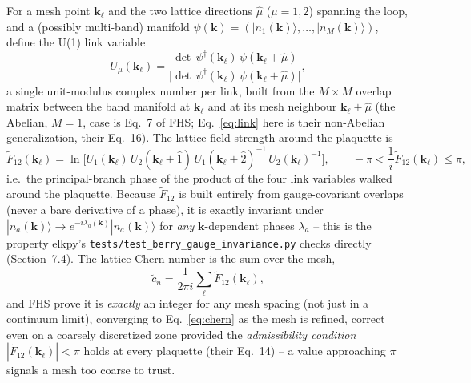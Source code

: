 \documentclass[11pt]{article}
\begin{document}
For a mesh point $\mathbf k_\ell$ and the two lattice directions $\hat\mu$ ($\mu=1,2$)
spanning the loop, and a (possibly multi-band) manifold $\psi(\mathbf k) =
(|n_1(\mathbf k)\rangle,\dots,|n_M(\mathbf k)\rangle)$, define the U(1) link variable
\begin{equation}
  U_\mu(\mathbf k_\ell) = \frac{\det\, \psi^\dagger(\mathbf k_\ell)\,
    \psi(\mathbf k_\ell+\hat\mu)}{\bigl|\det\, \psi^\dagger(\mathbf k_\ell)\,
    \psi(\mathbf k_\ell+\hat\mu)\bigr|},
  \label{eq:link}
\end{equation}
a single unit-modulus complex number per link, built from the $M \times M$ overlap
matrix between the band manifold at $\mathbf k_\ell$ and at its mesh neighbour
$\mathbf k_\ell+\hat\mu$ (the Abelian, $M=1$, case is Eq.~7 of FHS; Eq.~\eqref{eq:link}
here is their non-Abelian generalization, their Eq.~16). The lattice field strength
around the plaquette is
\begin{equation}
  \tilde F_{12}(\mathbf k_\ell) = \ln\!\bigl[
    U_1(\mathbf k_\ell)\, U_2(\mathbf k_\ell+\hat 1)\,
    U_1(\mathbf k_\ell+\hat 2)^{-1}\, U_2(\mathbf k_\ell)^{-1} \bigr],
  \qquad -\pi < \frac{1}{i}\tilde F_{12}(\mathbf k_\ell) \le \pi,
  \label{eq:fieldstrength}
\end{equation}
i.e.\ the principal-branch phase of the product of the four link variables walked
around the plaquette. Because $\tilde F_{12}$ is built entirely from gauge-covariant
overlaps (never a bare derivative of a phase), it is exactly invariant under
$|n_a(\mathbf k)\rangle \to e^{-i\lambda_a(\mathbf k)}|n_a(\mathbf k)\rangle$ for {\it
any} $\mathbf k$-dependent phases $\lambda_a$ -- this is the property elkpy's
\texttt{tests/test\_berry\_gauge\_invariance.py} checks directly (Section~7.4). The
lattice Chern number is the sum over the mesh,
\begin{equation}
  \tilde c_n = \frac{1}{2\pi i} \sum_\ell \tilde F_{12}(\mathbf k_\ell),
  \label{eq:latticechern}
\end{equation}
and FHS prove it is \emph{exactly} an integer for any mesh spacing (not just in a
continuum limit), converging to Eq.~\eqref{eq:chern} as the mesh is refined, correct
even on a coarsely discretized zone provided the \emph{admissibility condition}
$|\tilde F_{12}(\mathbf k_\ell)| < \pi$ holds at every plaquette (their Eq.~14) -- a
value approaching $\pi$ signals a mesh too coarse to trust.
\end{document}
